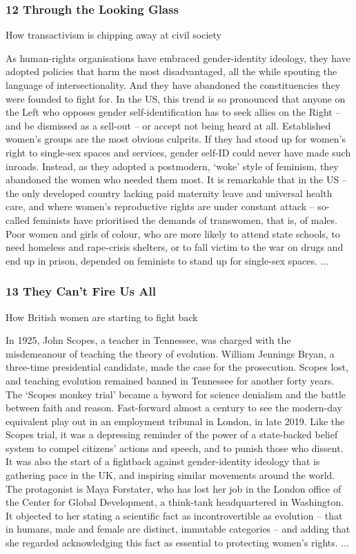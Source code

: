 \documentclass[10pt,titlepage]{book}
\begin{document}
\subsubsection{12 Through the Looking Glass}

How transactivism is chipping away at civil society

As human-rights organisations have embraced gender-identity ideology, they have adopted policies that harm the most disadvantaged, all the while spouting the language of intersectionality. And they have abandoned the constituencies they were founded to fight for. In the US, this trend is so pronounced that anyone on the Left who opposes gender self-identification has to seek allies on the Right – and be dismissed as a sell-out – or accept not being heard at all. Established women’s groups are the most obvious culprits. If they had stood up for women’s right to single-sex spaces and services, gender self-ID could never have made such inroads. Instead, as they adopted a postmodern, ‘woke’ style of feminism, they abandoned the women who needed them most. It is remarkable that in the US – the only developed country lacking paid maternity leave and universal health care, and where women’s reproductive rights are under constant attack – so-called feminists have prioritised the demands of transwomen, that is, of males. Poor women and girls of colour, who are more likely to attend state schools, to need homeless and rape-crisis shelters, or to fall victim to the war on drugs and end up in prison, depended on feminists to stand up for single-sex spaces.
...

\subsubsection{13 They Can’t Fire Us All}

How British women are starting to fight back

In 1925, John Scopes, a teacher in Tennessee, was charged with the misdemeanour of teaching the theory of evolution. William Jennings Bryan, a three-time presidential candidate, made the case for the prosecution. Scopes lost, and teaching evolution remained banned in Tennessee for another forty years. The ‘Scopes monkey trial’ became a byword for science denialism and the battle between faith and reason. Fast-forward almost a century to see the modern-day equivalent play out in an employment tribunal in London, in late 2019. Like the Scopes trial, it was a depressing reminder of the power of a state-backed belief system to compel citizens’ actions and speech, and to punish those who dissent. It was also the start of a fightback against gender-identity ideology that is gathering pace in the UK, and inspiring similar movements around the world. The protagonist is Maya Forstater, who has lost her job in the London office of the Center for Global Development, a think-tank headquartered in Washington. It objected to her stating a scientific fact as incontrovertible as evolution – that in humans, male and female are distinct, immutable categories – and adding that she regarded acknowledging this fact as essential to protecting women’s rights.
...
\end{document}
